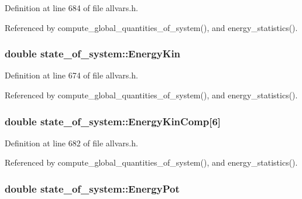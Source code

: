 Definition at line 684 of file allvars.h.



Referenced by compute\_\-global\_\-quantities\_\-of\_\-system(), and energy\_\-statistics().

\hypertarget{structstate__of__system_a92ed1ad5f1a02586030b21f5f3e560ec}{
\subsubsection[{EnergyKin}]{\setlength{\rightskip}{0pt plus 5cm}double {\bf state\_\-of\_\-system::EnergyKin}}}
\label{structstate__of__system_a92ed1ad5f1a02586030b21f5f3e560ec}


Definition at line 674 of file allvars.h.



Referenced by compute\_\-global\_\-quantities\_\-of\_\-system(), and energy\_\-statistics().

\hypertarget{structstate__of__system_a8b776a503b441fc690c0940e3386a2fb}{
\subsubsection[{EnergyKinComp}]{\setlength{\rightskip}{0pt plus 5cm}double {\bf state\_\-of\_\-system::EnergyKinComp}\mbox{[}6\mbox{]}}}
\label{structstate__of__system_a8b776a503b441fc690c0940e3386a2fb}


Definition at line 682 of file allvars.h.



Referenced by compute\_\-global\_\-quantities\_\-of\_\-system(), and energy\_\-statistics().

\hypertarget{structstate__of__system_aece07698cdbe00520fcb92ad9f04d435}{
\subsubsection[{EnergyPot}]{\setlength{\rightskip}{0pt plus 5cm}double {\bf state\_\-of\_\-system::EnergyPot}}}
\label{structstate__of__system_aece07698cdbe00520fcb92ad9f04d435}


